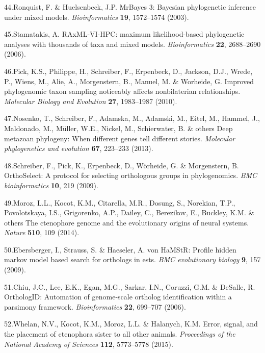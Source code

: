 \documentclass[]{article}
\begin{document}
\leavevmode\hypertarget{ref-Ronquist:2003hx}{}%
44.Ronquist, F. \& Huelsenbeck, J.P. MrBayes 3: Bayesian phylogenetic
inference under mixed models. \emph{Bioinformatics} \textbf{19},
1572--1574 (2003).

\leavevmode\hypertarget{ref-Stamatakis:2006wc}{}%
45.Stamatakis, A. RAxML-VI-HPC: maximum likelihood-based phylogenetic
analyses with thousands of taxa and mixed models. \emph{Bioinformatics}
\textbf{22}, 2688--2690 (2006).

\leavevmode\hypertarget{ref-Pick:2010eb}{}%
46.Pick, K.S., Philippe, H., Schreiber, F., Erpenbeck, D., Jackson,
D.J., Wrede, P., Wiens, M., Alie, A., Morgenstern, B., Manuel, M. \&
Worheide, G. Improved phylogenomic taxon sampling noticeably affects
nonbilaterian relationships. \emph{Molecular Biology and Evolution}
\textbf{27}, 1983--1987 (2010).

\leavevmode\hypertarget{ref-nosenko2013deep}{}%
47.Nosenko, T., Schreiber, F., Adamska, M., Adamski, M., Eitel, M.,
Hammel, J., Maldonado, M., Müller, W.E., Nickel, M., Schierwater, B. \&
others Deep metazoan phylogeny: When different genes tell different
stories. \emph{Molecular phylogenetics and evolution} \textbf{67},
223--233 (2013).

\leavevmode\hypertarget{ref-schreiber2009orthoselect}{}%
48.Schreiber, F., Pick, K., Erpenbeck, D., Wörheide, G. \& Morgenstern,
B. OrthoSelect: A protocol for selecting orthologous groups in
phylogenomics. \emph{BMC bioinformatics} \textbf{10}, 219 (2009).

\leavevmode\hypertarget{ref-moroz2014ctenophore}{}%
49.Moroz, L.L., Kocot, K.M., Citarella, M.R., Dosung, S., Norekian,
T.P., Povolotskaya, I.S., Grigorenko, A.P., Dailey, C., Berezikov, E.,
Buckley, K.M. \& others The ctenophore genome and the evolutionary
origins of neural systems. \emph{Nature} \textbf{510}, 109 (2014).

\leavevmode\hypertarget{ref-ebersberger2009hamstr}{}%
50.Ebersberger, I., Strauss, S. \& Haeseler, A. von HaMStR: Profile
hidden markov model based search for orthologs in ests. \emph{BMC
evolutionary biology} \textbf{9}, 157 (2009).

\leavevmode\hypertarget{ref-chiu2006orthologid}{}%
51.Chiu, J.C., Lee, E.K., Egan, M.G., Sarkar, I.N., Coruzzi, G.M. \&
DeSalle, R. OrthologID: Automation of genome-scale ortholog
identification within a parsimony framework. \emph{Bioinformatics}
\textbf{22}, 699--707 (2006).

\leavevmode\hypertarget{ref-whelan2015error}{}%
52.Whelan, N.V., Kocot, K.M., Moroz, L.L. \& Halanych, K.M. Error,
signal, and the placement of ctenophora sister to all other animals.
\emph{Proceedings of the National Academy of Sciences} \textbf{112},
5773--5778 (2015).
\end{document}
